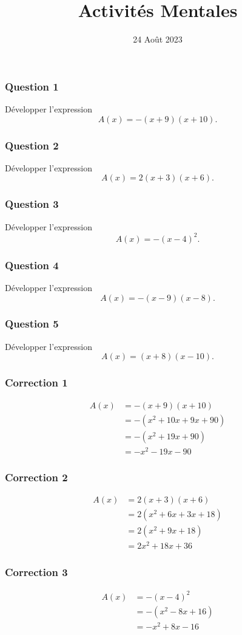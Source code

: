 \documentclass[15pt, mathserif]{beamer}
\title{Activités Mentales}
\date{24 Août 2023}
\begin{document}
\begin{frame}
    \titlepage
\end{frame}

\begin{frame} 
	\frametitle{Question 1}
	Développer l'expression \[A(x) = -\left(x+9\right) \left(x+10\right).\]\end{frame}


\begin{frame} 
	\frametitle{Question 2}
	Développer l'expression \[A(x) = 2\left(x+3\right) \left(x+6\right).\]\end{frame}


\begin{frame} 
	\frametitle{Question 3}
	Développer l'expression \[A(x) = -\left(x-4\right)^2.\]\end{frame}


\begin{frame} 
	\frametitle{Question 4}
	Développer l'expression \[A(x) = -\left(x-9\right) \left(x-8\right).\]\end{frame}


\begin{frame} 
	\frametitle{Question 5}
	Développer l'expression \[A(x) = \left(x+8\right) \left(x-10\right).\]\end{frame}


\begin{frame}
\vspace{-10mm}
	\frametitle{Correction 1}
	\begin{align*} A(x) &= -\left(x+9\right)\left(x+10\right)\\
		&=-\left(x^2+10x+9x+90\right)\\
		&=-\left(x^2+19x+90\right)\\
		&=-x^2-19x-90
	\end{align*}
\end{frame}


\begin{frame}
\vspace{-10mm}
	\frametitle{Correction 2}
	\begin{align*} A(x) &= 2\left(x+3\right)\left(x+6\right)\\
		&=2\left(x^2+6x+3x+18\right)\\
		&=2\left(x^2+9x+18\right)\\
		&=2x^2+18x+36
	\end{align*}
\end{frame}


\begin{frame}
\vspace{-10mm}
	\frametitle{Correction 3}
	\begin{align*} A(x) &= -\left(x-4\right)^2\\
		&=-\left(x^2-8x+16\right)\\
		&=-x^2+8x-16
	\end{align*}
\end{frame}
\end{document}
